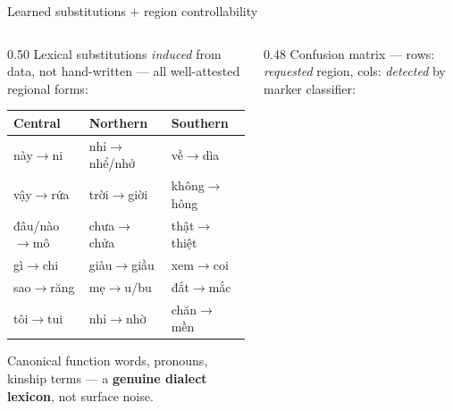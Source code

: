 \documentclass[aspectratio=169,11pt]{beamer}
\newcommand{\hl}[1]{\textcolor{oiblue}{\textbf{#1}}}
\begin{document}
\begin{frame}{Learned substitutions + region controllability}
  \begin{columns}[T]
    \begin{column}{0.50\textwidth}
      \centering
      {\scriptsize Lexical substitutions \emph{induced} from data, not hand-written --- all well-attested regional forms:}\\[0.3em]
      \scriptsize
      \begin{tabular}{l l l}
        \toprule
        \textbf{Central} & \textbf{Northern} & \textbf{Southern}\\
        \midrule
        này$\to$ni    & nhỉ$\to$nhể/nhở & về$\to$dìa\\
        vậy$\to$rứa   & trời$\to$giời   & không$\to$hông\\
        đâu/nào$\to$mô & chưa$\to$chửa   & thật$\to$thiệt\\
        gì$\to$chi    & giàu$\to$giầu   & xem$\to$coi\\
        sao$\to$răng  & mẹ$\to$u/bu     & đắt$\to$mắc\\
        tôi$\to$tui   & nhỉ$\to$nhờ     & chăn$\to$mền\\
        \bottomrule
      \end{tabular}
      \par\vspace{0.3em}
      {\scriptsize Canonical function words, pronouns, kinship terms --- a \hl{genuine dialect lexicon}, not surface noise.}
    \end{column}
    \begin{column}{0.48\textwidth}
      \centering
      {\scriptsize Confusion matrix --- rows: \emph{requested} region, cols: \emph{detected} by marker classifier:}\\[0.3em]
\end{column}
\end{columns}
\end{frame}
\end{document}
